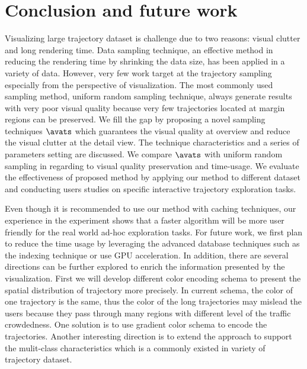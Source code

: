 \section{Conclusion and future work}

Visualizing large trajectory dataset is challenge due to two reasons: visual clutter and long rendering time.
Data sampling technique, an effective method in reducing the rendering time by shrinking the data size, has been applied in a variety of data.
However, very few work target at the trajectory sampling especially from the perspective of visualization.
The most commonly used sampling method, uniform random sampling technique, always generate results with very poor visual quality because very few trajectories located at margin regions can be preserved.
We fill the gap by proposing a novel sampling techniques $\avats$ which guarantees the visual quality at overview and reduce the visual clutter at the detail view. The technique characteristics and a series of parameters setting are discussed.
We compare $\avats$ with uniform random sampling in regarding to visual quality preservation and time-usage. We evaluate the effectiveness of proposed method by applying our method to different dataset and conducting users studies on specific interactive trajectory exploration tasks.


Even though it is recommended to use our method with caching techniques, our experience in the experiment shows that a faster algorithm will be more user friendly for the real world ad-hoc exploration tasks. For future work, we first plan to reduce the time usage by leveraging the advanced database techniques such as the indexing technique or use GPU acceleration. 
In addition, there are several directions can be further explored to enrich the information presented by the visualization. 
First we will develop different color encoding schema to present the spatial distribution of trajectory more precisely. 
In current schema, the color of one trajectory is the same, thus the color of the long trajectories may mislead the users because they pass  through many regions with different level of the traffic crowdedness. One solution is to use gradient color schema to encode the trajectories.
Another interesting direction is to extend the approach to support the mulit-class characteristics which is a commonly existed in variety of trajectory dataset.